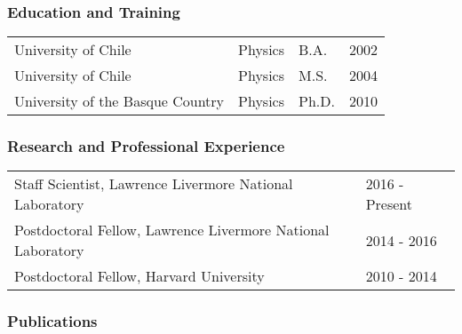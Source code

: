 \subsubsection*{Education and Training}

\begin{table}[ht]
    \centering
    \begin{tabular}{llll}
        University of Chile & Physics & B.A. & 2002  \\
        University of Chile & Physics & M.S. & 2004 \\
        University of the Basque Country & Physics & Ph.D. & 2010\\
    \end{tabular}
\end{table}

\subsubsection*{Research and Professional Experience}

\begin{table}[ht]
    \centering
    \begin{tabular}{ll}
Staff Scientist, Lawrence Livermore National Laboratory &       2016 - Present   \\
Postdoctoral Fellow, Lawrence Livermore National Laboratory     &  2014 - 2016   \\
Postdoctoral Fellow, Harvard University &       2010 - 2014 \\
    \end{tabular}
\end{table}

\subsubsection*{Publications}

